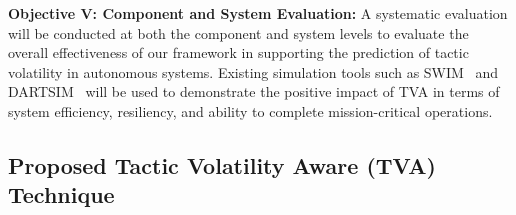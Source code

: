 \documentclass[12pt]{article}
\newcommand{\dan}[1]{\textcolor{blue}{{\it [Dan: #1]}}}
\begin{document}
\vspace{1mm} \noindent \textbf{Objective V: Component and System Evaluation:} A systematic evaluation will be conducted at both the component and system levels to evaluate the overall effectiveness of our framework in supporting the prediction of tactic volatility in autonomous systems. Existing simulation tools such as SWIM~\cite{moreno2018swim} and DARTSIM~\cite{MorenoDART2019} will be used to demonstrate the positive impact of TVA in terms of system efficiency, resiliency, and ability to complete mission-critical operations.


\vspace{-3mm}
\subsection{Proposed Tactic Volatility Aware (TVA) Technique}

\end{document}
